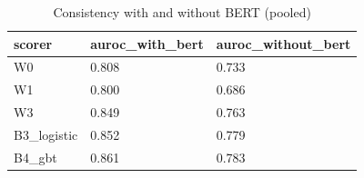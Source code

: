 \begin{table}[t]
\centering
\small
\begin{tabular}{lll}
\hline
scorer & auroc\_with\_bert & auroc\_without\_bert \\
\hline
W0 & 0.808 & 0.733 \\
W1 & 0.800 & 0.686 \\
W3 & 0.849 & 0.763 \\
B3\_logistic & 0.852 & 0.779 \\
B4\_gbt & 0.861 & 0.783 \\
\hline
\end{tabular}
\caption{Consistency with and without BERT (pooled)}
\label{tab:bert_pooled}
\end{table}
